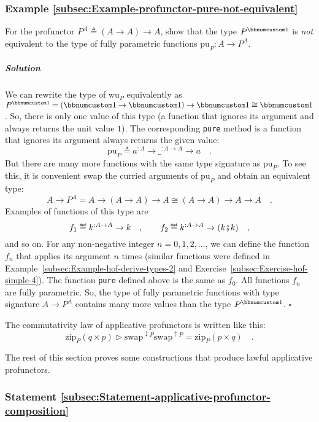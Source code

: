 \subsubsection{Example \label{subsec:Example-profunctor-pure-not-equivalent}\ref{subsec:Example-profunctor-pure-not-equivalent}}

For the profunctor $P^{A}\triangleq\left(A\rightarrow A\right)\rightarrow A$,
show that the type $P^{\bbnum 1}$ is \emph{not} equivalent to the
type of fully parametric functions $\text{pu}_{P}:A\rightarrow P^{A}$.

\subparagraph{Solution}

We can rewrite the type of $\text{wu}_{P}$ equivalently as $P^{\bbnum 1}=\left(\bbnum 1\rightarrow\bbnum 1\right)\rightarrow\bbnum 1\cong\bbnum 1$.
So, there is only one value of this type (a function that ignores
its argument and always returns the unit value $1$). The corresponding
\lstinline!pure! method is a function that ignores its argument always
returns the given value:
\[
\text{pu}_{P}\triangleq a^{:A}\rightarrow\_^{:A\rightarrow A}\rightarrow a\quad.
\]
But there are many more functions with the same type signature as
$\text{pu}_{P}$. To see this, it is convenient swap the curried arguments
of $\text{pu}_{P}$ and obtain an equivalent type: 
\[
A\rightarrow P^{A}=A\rightarrow\left(A\rightarrow A\right)\rightarrow A\cong\left(A\rightarrow A\right)\rightarrow A\rightarrow A\quad.
\]
Examples of functions of this type are
\[
f_{1}\triangleq k^{:A\rightarrow A}\rightarrow k\quad,\quad\quad f_{2}\triangleq k^{:A\rightarrow A}\rightarrow(k\bef k)\quad,
\]
and so on. For any non-negative integer $n=0,1,2,...$, we can define
the function $f_{n}$ that applies its argument $n$ times (similar
functions were defined in Example~\ref{subsec:Example-hof-derive-types-2}
and Exercise~\ref{subsec:Exercise-hof-simple-4}). The function \lstinline!pure!
defined above is the same as $f_{0}$. All functions $f_{n}$ are
fully parametric. So, the type of fully parametric functions with
type signature $A\rightarrow P^{A}$ contains many more values than
the type $P^{\bbnum 1}$. $\square$

The commutativity law of applicative profunctors is written like this:
\[
\text{zip}_{P}(q\times p)\triangleright\text{swap}^{\downarrow P}\text{swap}^{\uparrow P}=\text{zip}_{P}(p\times q)\quad.
\]

The rest of this section proves some constructions that produce lawful
applicative profunctors.

\subsubsection{Statement \label{subsec:Statement-applicative-profunctor-composition}\ref{subsec:Statement-applicative-profunctor-composition}}

